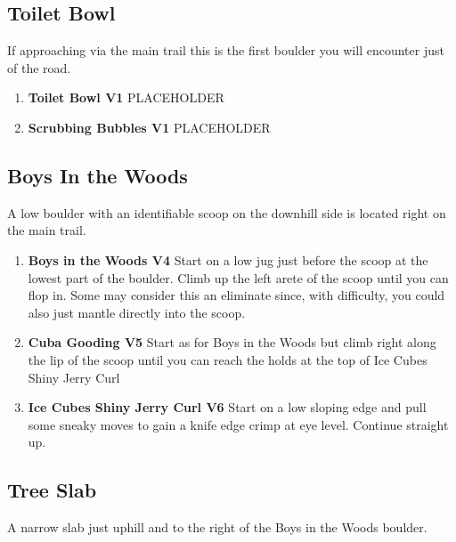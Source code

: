 \subsection*{Toilet Bowl}\label{bf:Toilet Bowl}
If approaching via the main trail this is the first boulder you will encounter just of the road.

\begin{enumerate}[resume]
	\item\label{rt:Toilet Bowl} \colorbox{green!20}{\textbf{Toilet Bowl V1  } }
	\newline PLACEHOLDER\
	\item\label{rt:Scrubbing Bubbles} \colorbox{green!20}{\textbf{Scrubbing Bubbles V1  } }
	\newline PLACEHOLDER\
\end{enumerate}
\subsection*{Boys In the Woods}\label{bf:Boys In the Woods}
A low boulder with an identifiable scoop on the downhill side is located right on the main trail.

\begin{enumerate}[resume]
	\item\label{rt:Boys in the Woods} \colorbox{RoyalBlue!20}{\textbf{Boys in the Woods V4    } }
	\newline Start on a low jug just before the scoop at the lowest part of the boulder. Climb up the left arete of the scoop until you can flop in. Some may consider this an eliminate since, with difficulty, you could also just mantle directly into the scoop.\
	\item\label{rt:Cuba Gooding} \colorbox{RoyalBlue!20}{\textbf{Cuba Gooding V5  } }
	\newline Start as for Boys in the Woods but climb right along the lip of the scoop until you can reach the holds at the top of Ice Cubes Shiny Jerry Curl\
	\item\label{rt:Ice Cubes Shiny Jerry Curl} \colorbox{RoyalBlue!20}{\textbf{Ice Cubes Shiny Jerry Curl V6  } }
	\newline Start on a low sloping edge and pull some sneaky moves to gain a knife edge crimp at eye level. Continue straight up.\
\end{enumerate}
\subsection*{Tree Slab}\label{bf:Tree Slab}
A narrow slab just uphill and to the right of the Boys in the Woods boulder.

